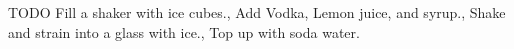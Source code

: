 \documentclass[../main.tex]{subfiles}
\begin{document}

{
	TODO
}
{
	{Fill a shaker with ice cubes.},
	{Add Vodka, Lemon juice, and syrup.},
	{Shake and strain into a glass with ice.},
	{Top up with soda water.}
}

\end{document}
